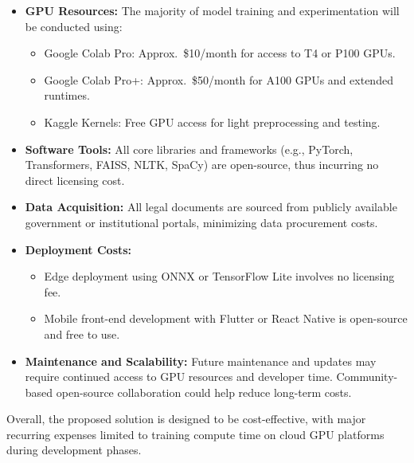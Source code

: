 \begin{itemize}
    \item \textbf{GPU Resources:} The majority of model training and experimentation will be conducted using:
    \begin{itemize}
        \item Google Colab Pro: Approx.\ \$10/month for access to T4 or P100 GPUs.
        \item Google Colab Pro+: Approx.\ \$50/month for A100 GPUs and extended runtimes.
        \item Kaggle Kernels: Free GPU access for light preprocessing and testing.
    \end{itemize}
    
    \item \textbf{Software Tools:} All core libraries and frameworks (e.g., PyTorch, Transformers, FAISS, NLTK, SpaCy) are open-source, thus incurring no direct licensing cost.

    \item \textbf{Data Acquisition:} All legal documents are sourced from publicly available government or institutional portals, minimizing data procurement costs.

    \item \textbf{Deployment Costs:} 
    \begin{itemize}
        \item Edge deployment using ONNX or TensorFlow Lite involves no licensing fee.
        \item Mobile front-end development with Flutter or React Native is open-source and free to use.
    \end{itemize}

    \item \textbf{Maintenance and Scalability:} Future maintenance and updates may require continued access to GPU resources and developer time. Community-based open-source collaboration could help reduce long-term costs.

\end{itemize}

Overall, the proposed solution is designed to be cost-effective, with major recurring expenses limited to training compute time on cloud GPU platforms during development phases.

